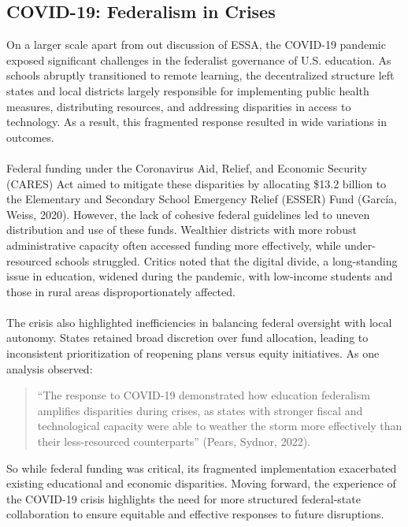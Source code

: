 \documentclass[11pt]{extarticle}
\begin{document}
\subsection{COVID-19: Federalism in Crises}
On a larger scale apart from out discussion of ESSA, the COVID-19 pandemic exposed significant challenges in the federalist governance of U.S. education. As schools abruptly transitioned to remote learning, the decentralized structure left states and local districts largely responsible for implementing public health measures, distributing resources, and addressing disparities in access to technology. As a result, this fragmented response resulted in wide variations in outcomes.\\
\\
Federal funding under the Coronavirus Aid, Relief, and Economic Security (CARES) Act aimed to mitigate these disparities by allocating \$13.2 billion to the Elementary and Secondary School Emergency Relief (ESSER) Fund (García, Weiss, 2020). However, the lack of cohesive federal guidelines led to uneven distribution and use of these funds. Wealthier districts with more robust administrative capacity often accessed funding more effectively, while under-resourced schools struggled. Critics noted that the digital divide, a long-standing issue in education, widened during the pandemic, with low-income students and those in rural areas disproportionately affected.\\
\\
The crisis also highlighted inefficiencies in balancing federal oversight with local autonomy. States retained broad discretion over fund allocation, leading to inconsistent prioritization of reopening plans versus equity initiatives. As one analysis observed:
\begin{quote}
``The response to COVID-19 demonstrated how education federalism amplifies disparities during crises, as states with stronger fiscal and technological capacity were able to weather the storm more effectively than their less-resourced counterparts” (Pears, Sydnor, 2022).
\end{quote}
So while federal funding was critical, its fragmented implementation exacerbated existing educational and economic disparities. Moving forward, the experience of the COVID-19 crisis highlights the need for more structured federal-state collaboration to ensure equitable and effective responses to future disruptions.
\end{document}
